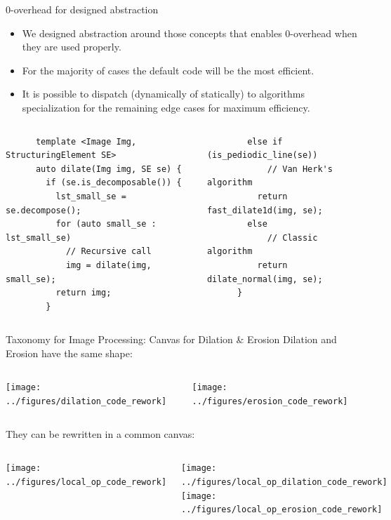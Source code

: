 \documentclass[12pt,aspectratio=169]{beamer}
\begin{document}
\begin{frame}[fragile]{0-overhead for designed abstraction}
  \begin{itemize}
    \item We designed abstraction around those concepts that enables 0-overhead when they are used properly.
    \item For the majority of cases the default code will be the most efficient.
    \item It is possible to dispatch (dynamically of statically) to algorithms specialization for the remaining edge
          cases for maximum efficiency.
  \end{itemize}
  \begin{columns}[T,onlytextwidth]
    \begin{verbatim}
      template <Image Img, StructuringElement SE>
      auto dilate(Img img, SE se) {
        if (se.is_decomposable()) {
          lst_small_se = se.decompose();
          for (auto small_se : lst_small_se)
            // Recursive call
            img = dilate(img, small_se);
          return img;
        }
          \end{verbatim}

    \begin{verbatim}
        else if (is_pediodic_line(se))
            // Van Herk's algorithm
          return fast_dilate1d(img, se);
        else
            // Classic algorithm
          return dilate_normal(img, se);
      }
      \end{verbatim}
  \end{columns}

\end{frame}

\begin{frame}[fragile]{Taxonomy for Image Processing: Canvas for Dilation \& Erosion}
  Dilation and Erosion have the same shape:
  \begin{columns}[T,onlytextwidth]
    \texttt{[image: ../figures/dilation\_code\_rework]}

    \texttt{[image: ../figures/erosion\_code\_rework]}
  \end{columns}
  \bigskip
  They can be rewritten in a common canvas:
  \begin{columns}[T,onlytextwidth]
    \texttt{[image: ../figures/local\_op\_code\_rework]}

    \texttt{[image: ../figures/local\_op\_dilation\_code\_rework]}
    \texttt{[image: ../figures/local\_op\_erosion\_code\_rework]}
  \end{columns}
\end{frame}
\end{document}
